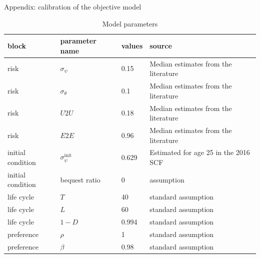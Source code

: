\documentclass{beamer}
\begin{document}
\begin{frame}{Appendix: calibration of the objective model}
	\label{appendix:calibration}	
	\begin{table}[p]
		\centering
			\caption{Model parameters}
			\label{tab:calibration}
					\begin{adjustbox}{width={0.8\textwidth}}
	\begin{tabular}{llll}
		\hline 
		
		block             & parameter name              & values & source                               \\
		\hline 
		
		risk              & $\sigma_\psi$               & 0.15   & Median estimates from the literature \\
		risk              & $\sigma_\theta$             & 0.1    & Median estimates from the literature \\
		risk              & $U2U$                       & 0.18   & Median estimates from the literature \\
		risk              & $E2E$                       & 0.96   & Median estimates from the literature \\
		\hline 
		
		initial condition & $\sigma_\psi^{\text{init}}$ & 0.629  & Estimated for age 25 in the 2016 SCF \\
		initial condition & bequest ratio               & 0      & assumption                           \\
		\hline 
		
		life cycle        & $T$                         & 40     & standard assumption                  \\
		life cycle        & $L$                         & 60     & standard assumption                  \\
		life cycle        & $1-D$                       & 0.994  & standard assumption                  \\
		\hline 
		
		preference        & $\rho$                      & 1      & standard assumption                  \\
		preference        & $\beta$                     & 0.98   & standard assumption                  \\
		\hline 
		

\end{tabular}
\end{adjustbox}
\end{table}
\end{frame}
\end{document}
